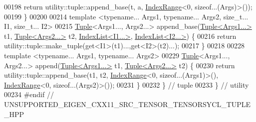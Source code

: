 \begin{DoxyCode}
00198   \textcolor{keywordflow}{return} utility::tuple::append\_base(t, a,  \hyperlink{structutility_1_1tuple_1_1_index_range}{IndexRange}<0, \textcolor{keyword}{sizeof}...(Args)>());
00199 \}
00200 
00214 \textcolor{keyword}{template} <\textcolor{keyword}{typename}... Args1, \textcolor{keyword}{typename}... Args2, \textcolor{keywordtype}{size\_t}... I1, \textcolor{keywordtype}{size\_t}... I2>
00215 \hyperlink{structutility_1_1tuple_1_1_tuple}{Tuple}<Args1..., Args2...> append\_base(\hyperlink{structutility_1_1tuple_1_1_tuple}{Tuple<Args1...>} t1, 
      \hyperlink{structutility_1_1tuple_1_1_tuple}{Tuple<Args2...>} t2, \hyperlink{structutility_1_1tuple_1_1_index_list}{IndexList<I1...>}, 
      \hyperlink{structutility_1_1tuple_1_1_index_list}{IndexList<I2...>}) \{
00216   \textcolor{keywordflow}{return} utility::tuple::make\_tuple(get<I1>(t1)...,get<I2>(t2)...);
00217 \}
00218 
00228 \textcolor{keyword}{template} <\textcolor{keyword}{typename}... Args1, \textcolor{keyword}{typename}... Args2>
00229 \hyperlink{structutility_1_1tuple_1_1_tuple}{Tuple}<Args1..., Args2...> append(\hyperlink{structutility_1_1tuple_1_1_tuple}{Tuple<Args1...>} t1,
      \hyperlink{structutility_1_1tuple_1_1_tuple}{Tuple<Args2...>} t2) \{
00230   \textcolor{keywordflow}{return} utility::tuple::append\_base(t1, t2, \hyperlink{structutility_1_1tuple_1_1_index_range}{IndexRange}<0, \textcolor{keyword}{sizeof}...(Args1)>(), 
      \hyperlink{structutility_1_1tuple_1_1_index_range}{IndexRange}<0, \textcolor{keyword}{sizeof}...(Args2)>());
00231 \}
00232 \}  \textcolor{comment}{// tuple}
00233 \}  \textcolor{comment}{// utility}
00234 \textcolor{preprocessor}{#endif  // UNSUPPORTED\_EIGEN\_CXX11\_SRC\_TENSOR\_TENSORSYCL\_TUPLE\_HPP}
\end{DoxyCode}
